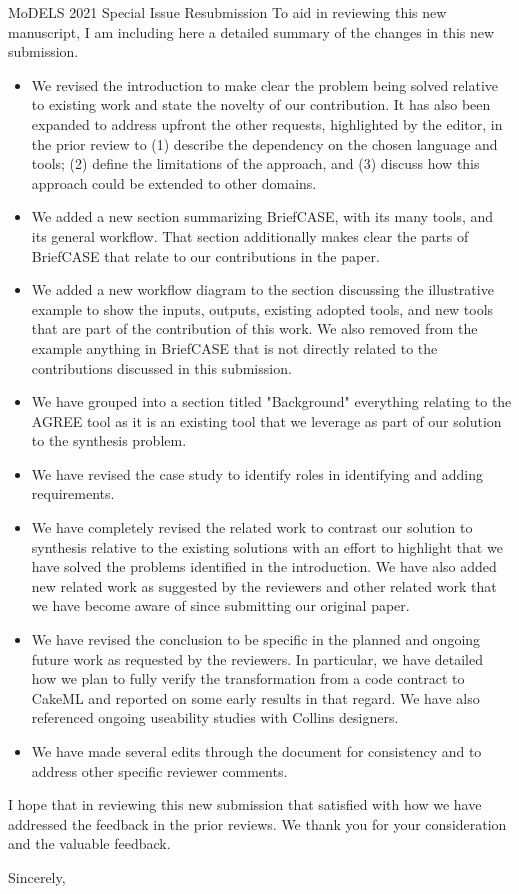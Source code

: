 \documentclass[10pt]{byu-cs}
\begin{document}
\begin{letter}{MoDELS 2021 Special Issue Resubmission}
To aid in reviewing this new manuscript, I am including here a detailed summary of the changes in this new submission.
\begin{itemize}
  \item We revised the introduction to make clear the problem being solved relative to existing work and state the novelty of our contribution. It has also been expanded to address upfront the other requests, highlighted by the editor, in the prior review to (1) describe the dependency on the chosen language and tools; (2) define the limitations of the approach, and (3) discuss how this approach could be extended to other domains.
  \item We added a new section summarizing BriefCASE, with its many tools, and its general workflow. That section additionally makes clear the parts of BriefCASE that relate to our contributions in the paper.
  \item We added a new workflow diagram to the section discussing the illustrative example to show the inputs, outputs, existing adopted tools, and new tools that are part of the contribution of this work. We also removed from the example anything in BriefCASE that is not directly related to the contributions discussed in this submission.
  \item We have grouped into a section titled "Background" everything relating to the AGREE tool as it is an existing tool that we leverage as part of our solution to the synthesis problem.
  \item We have revised the case study to identify roles in identifying and adding requirements.
  \item We have completely revised the related work to contrast our solution to synthesis relative to the existing solutions with an effort to highlight that we have solved the problems identified in the introduction. We have also added new related work as suggested by the reviewers and other related work that we have become aware of since submitting our original paper.
  \item We have revised the conclusion to be specific in the planned and ongoing future work as requested by the reviewers. In particular, we have detailed how we plan to fully verify the transformation from a code contract to CakeML and reported on some early results in that regard. We have also referenced ongoing useability studies with Collins designers.
  \item We have made several edits through the document for consistency and to address other specific reviewer comments.
\end{itemize}

I hope that in reviewing this new submission that satisfied with how we have addressed the feedback in the prior reviews.
We thank you for your consideration and the valuable feedback.

\closing{Sincerely,}

\end{letter}
\end{document}
